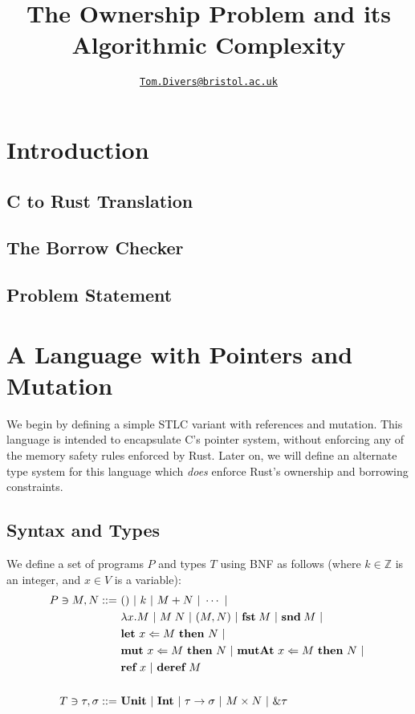 \documentclass{article}
\title{The Ownership Problem and its Algorithmic Complexity}
\author{\href{mailto:oi24939@bristol.ac.uk}{\texttt{Tom.Divers@bristol.ac.uk}}}
\date{}
\newcommand{\agap}{\hspace{0.25em}}
\newcommand{\mkref}{\textbf{ref}~}
\newcommand{\deref}{\textbf{deref}~}%
\newcommand{\mutate}[3]{\textbf{mut}~ #1 \Leftarrow #2 ~\textbf{then}~ #3}
\newcommand{\mutptr}[3]{\textbf{mutAt}~ #1 \Leftarrow #2 ~\textbf{then}~ #3}
\newcommand{\letvar}[3]{\textbf{let}~ #1 \Leftarrow #2 ~\textbf{then}~ #3}
\begin{document}
\maketitle

\section{Introduction}

\subsection{C to Rust Translation}

\cite{zhang2023crown}

\subsection{The Borrow Checker}

\subsection{Problem Statement}

\section{A Language with Pointers and Mutation}

We begin by defining a simple STLC variant with references and mutation. This language is intended to encapsulate C's pointer system, without enforcing any of the memory safety rules enforced by Rust. Later on, we will define an alternate type system for this language which \textit{does} enforce Rust's ownership and borrowing constraints.


\subsection{Syntax and Types}

We define a set of programs $P$ and types $T$ using BNF as follows (where $k \in \mathbb{Z}$ is an integer, and $x \in V$ is a variable):
\begin{align*}
    P \ni M, N ::=~ &() ~|~ k ~|~ M + N ~|~ \cdots ~|~\\ 
    &\lambda x . M ~|~ M \agap N ~|~ (M, N) ~|~ \textbf{fst}\agap M ~|~ \textbf{snd}\agap M ~|~\\
    &\letvar{x}{M}{N} ~|~\\ 
    &\mutate{x}{M}{N} ~|~ \mutptr{x}{M}{N} ~|~\\
    &\mkref x ~|~ \deref M\\    
    ~\\
    T \ni \tau, \sigma ::=~ &\textbf{Unit} ~|~ \textbf{Int} ~|~ \tau \rightarrow \sigma ~|~ M \times N ~|~ \& \tau
\end{align*}
\end{document}
